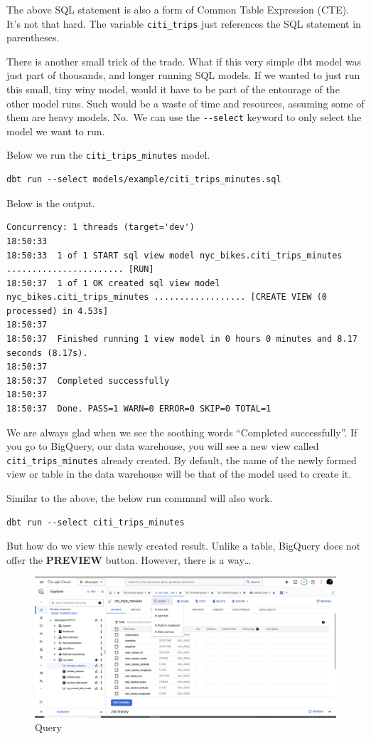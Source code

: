 \documentclass[
]{book}
\begin{document}
The above SQL statement is also a form of Common Table Expression (CTE). It's not that hard. The variable \texttt{citi\_trips} just references the SQL statement in parentheses.

There is another small trick of the trade. What if this very simple dbt model was just part of thousands, and longer running SQL models. If we wanted to just run this small, tiny winy model, would it have to be part of the entourage of the other model runs. Such would be a waste of time and resources, assuming some of them are heavy models. No.~We can use the \texttt{-\/-select} keyword to only select the model we want to run.

Below we run the \texttt{citi\_trips\_minutes} model.

\begin{verbatim}
dbt run --select models/example/citi_trips_minutes.sql
\end{verbatim}

Below is the output.

\begin{verbatim}
Concurrency: 1 threads (target='dev')
18:50:33  
18:50:33  1 of 1 START sql view model nyc_bikes.citi_trips_minutes ....................... [RUN]
18:50:37  1 of 1 OK created sql view model nyc_bikes.citi_trips_minutes .................. [CREATE VIEW (0 processed) in 4.53s]
18:50:37  
18:50:37  Finished running 1 view model in 0 hours 0 minutes and 8.17 seconds (8.17s).
18:50:37  
18:50:37  Completed successfully
18:50:37  
18:50:37  Done. PASS=1 WARN=0 ERROR=0 SKIP=0 TOTAL=1
\end{verbatim}

We are always glad when we see the soothing words ``Completed successfully''. If you go to BigQuery, our data warehouse, you will see a new view called \texttt{citi\_trips\_minutes} already created. By default, the name of the newly formed view or table in the data warehouse will be that of the model used to create it.

Similar to the above, the below run command will also work.

\begin{verbatim}
dbt run --select citi_trips_minutes
\end{verbatim}

But how do we view this newly created result. Unlike a table, BigQuery does not offer the \textbf{PREVIEW} button. However, there is a way\ldots{}

\begin{figure}
\centering
\includegraphics{./images/query_button.png}
\caption{Query}
\end{figure}
\end{document}
